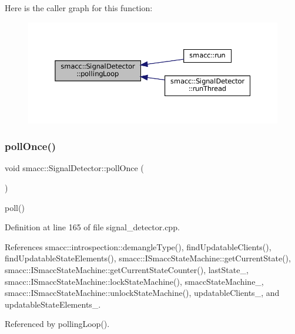 Here is the caller graph for this function\+:
\nopagebreak
\begin{figure}[H]
\begin{center}
\leavevmode
\includegraphics[width=350pt]{classsmacc_1_1SignalDetector_a2665e66cdae9f6533c64bbcecf3fa199_icgraph}
\end{center}
\end{figure}
\mbox{\label{classsmacc_1_1SignalDetector_a9a116479e23259f3a5d5d4a47278afd5}} 
\subsubsection{\texorpdfstring{poll\+Once()}{pollOnce()}}
{\footnotesize\ttfamily void smacc\+::\+Signal\+Detector\+::poll\+Once (\begin{DoxyParamCaption}{ }\end{DoxyParamCaption})}

poll() 

Definition at line 165 of file signal\+\_\+detector.\+cpp.



References smacc\+::introspection\+::demangle\+Type(), find\+Updatable\+Clients(), find\+Updatable\+State\+Elements(), smacc\+::\+I\+Smacc\+State\+Machine\+::get\+Current\+State(), smacc\+::\+I\+Smacc\+State\+Machine\+::get\+Current\+State\+Counter(), last\+State\+\_\+, smacc\+::\+I\+Smacc\+State\+Machine\+::lock\+State\+Machine(), smacc\+State\+Machine\+\_\+, smacc\+::\+I\+Smacc\+State\+Machine\+::unlock\+State\+Machine(), updatable\+Clients\+\_\+, and updatable\+State\+Elements\+\_\+.



Referenced by polling\+Loop().



